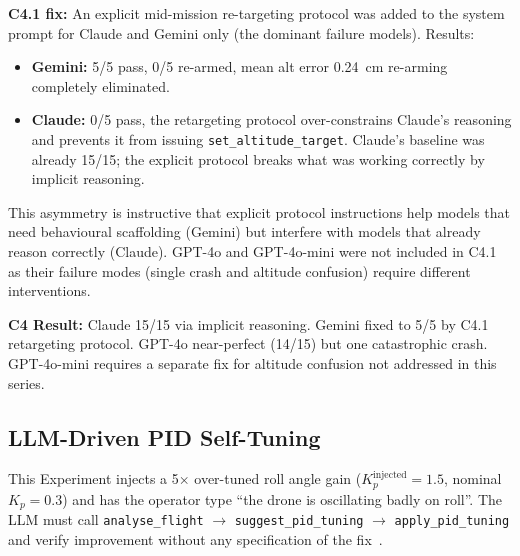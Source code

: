 \textbf{C4.1 fix:} An explicit mid-mission re-targeting protocol was added to the system prompt for Claude and Gemini only (the dominant failure models). 
Results:
\begin{itemize}
  \item \textbf{Gemini:} 5/5 pass, 0/5 re-armed, mean alt error 0.24~cm re-arming completely eliminated.
  \item \textbf{Claude:} 0/5 pass, the retargeting protocol over-constrains Claude's reasoning and prevents it from issuing \texttt{set\_altitude\_target}.
  Claude's baseline was already 15/15; the explicit protocol breaks what was working correctly by implicit reasoning.
\end{itemize}
This asymmetry is instructive that explicit protocol instructions help models that need behavioural scaffolding (Gemini) but interfere with models that
already reason correctly (Claude). 
GPT-4o and GPT-4o-mini were not included in C4.1 as their failure modes (single crash and altitude confusion) require
different interventions.

\textbf{C4 Result:} Claude 15/15 via implicit reasoning. Gemini fixed to 5/5 by C4.1 retargeting protocol. 
GPT-4o near-perfect (14/15) but one catastrophic crash. 
GPT-4o-mini requires a separate fix for altitude confusion not addressed in this series.

\subsection{LLM-Driven PID Self-Tuning}
\label{sec:ch3_c5}

This Experiment injects a 5$\times$ over-tuned roll angle gain ($K_p^\text{injected} = 1.5$, nominal $K_p = 0.3$) and has the operator type ``the drone is oscillating badly on roll''. 
The LLM must call \texttt{analyse\_flight} $\to$ \texttt{suggest\_pid\_tuning} $\to$ \texttt{apply\_pid\_tuning} and verify improvement without any specification of the fix~\cite{vemprala2023chatgpt}.

